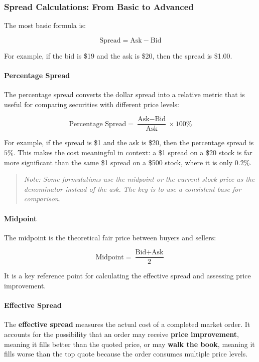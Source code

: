 \documentclass[12pt,openany]{book}
\begin{document}
\subsubsection{Spread Calculations: From Basic to Advanced}
The most basic formula is:

\begin{equation*}
    \text{Spread} = \text{Ask} - \text{Bid}
\end{equation*}

For example, if the bid is \$19 and the ask is \$20, then the spread is \$1.00.

\paragraph{Percentage Spread}
The percentage spread converts the dollar spread into a relative metric that is useful for comparing securities with different price levels:

\begin{equation*}
    \text{Percentage Spread} = \frac{\text{Ask} - \text{Bid}}{\text{Ask}} \times 100\%
\end{equation*}

For example, if the spread is \$1 and the ask is \$20, then the percentage spread is $5\%$. This makes the cost meaningful in context: a \$1 spread on a \$20 stock is far more significant than the same \$1 spread on a \$500 stock, where it is only $0.2\%$.

\begin{quote}
\textit{Note: Some formulations use the midpoint or the current stock price as the denominator instead of the ask. The key is to use a consistent base for comparison.}
\end{quote}

\paragraph{Midpoint}
The midpoint is the theoretical fair price between buyers and sellers:

\begin{equation*}
    \text{Midpoint} = \frac{\text{Bid} + \text{Ask}}{2}
\end{equation*}

It is a key reference point for calculating the effective spread and assessing price improvement.

\paragraph{Effective Spread}
The \textbf{effective spread} measures the actual cost of a completed market order. It accounts for the possibility that an order may receive \textbf{price improvement}, meaning it fills better than the quoted price, or may \textbf{walk the book}, meaning it fills worse than the top quote because the order consumes multiple price levels.
\end{document}
